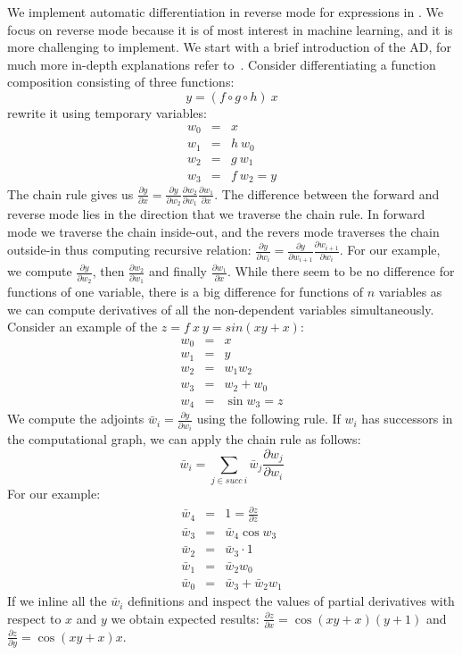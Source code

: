 We implement automatic differentiation in reverse mode
for expressions in .  We focus on reverse mode because it is
of most interest in machine learning, and it is more challenging to implement.
We start with a brief introduction of the AD, for much more in-depth
explanations refer to~\cite{autodiff-survey, backprop-stlc}.   Consider differentiating
a function composition consisting of three functions:
\[ 
   y = (f \circ g \circ h)\ x
\]
rewrite it using temporary variables:
\begin{eqnarray*}
  w_0 &=& x \\
  w_1 &=& h\ w_0 \\
  w_2 &=& g\ w_1 \\
  w_3 &=& f\ w_2 = y
\end{eqnarray*}
The chain rule gives us 
$\frac{\partial y}{\partial x} 
  = \frac{\partial y}{\partial w_2}
    \frac{\partial w_2}{\partial w_1}
    \frac{\partial w_1}{\partial x}$.  The difference between the forward and reverse
    mode lies in the direction that we traverse the chain rule.  In forward mode we
    traverse the chain inside-out, and the revers mode traverses the chain outside-in
    thus computing recursive relation:
$\frac{\partial y}{\partial w_i}
  = \frac{\partial y}{\partial w_{i+1}}
    \frac{\partial w_{i+1}}{\partial w_i}$.  For our example, we compute
$\frac{\partial y}{\partial w_2}$, then $\frac{\partial w_2}{\partial w_1}$ and
finally $\frac{\partial w_1}{\partial x}$.  While there seem to be no difference for
functions of one variable, there is a big difference for functions of $n$ variables
as we can compute derivatives of all the non-dependent variables simultaneously.
Consider an example of the $z = f\ x\ y = sin(xy + x)$:
\begin{eqnarray*}
  w_0 &=& x \\
  w_1 &=& y \\
  w_2 &=& w_1w_2\\
  w_3 &=& w_2 + w_0 \\
  w_4 &=& \sin w_3 = z
\end{eqnarray*}
We compute the adjoints $\bar{w}_i = \frac{\partial y}{\partial w_i}$ using the following
rule.  If $w_i$ has successors in the computational graph, we can apply the chain rule
as follows:
\[ 
    \bar{w}_i = \sum_{j \in succ\ i} \bar{w}_j\frac{\partial w_j}{\partial w_i}
\]
For our example:
\begin{eqnarray*}
  \bar{w}_4 &=& 1 = \frac{\partial z}{\partial z} \\
  \bar{w}_3 &=& \bar{w}_4 \cos w_3\\
  \bar{w}_2 &=& \bar{w}_3 \cdot 1 \\
  \bar{w}_1 &=& \bar{w}_2 w_0 \\
  \bar{w}_0 &=& \bar{w}_3 + \bar{w}_2 w_1
\end{eqnarray*}
If we inline all the $\bar{w}_i$ definitions and inspect the values of partial derivatives
with respect to $x$ and $y$ we obtain expected results:
$\frac{\partial z}{\partial x} = \cos (xy + x)(y + 1)$ and
$\frac{\partial z}{\partial y} = \cos (xy + x)x$.


